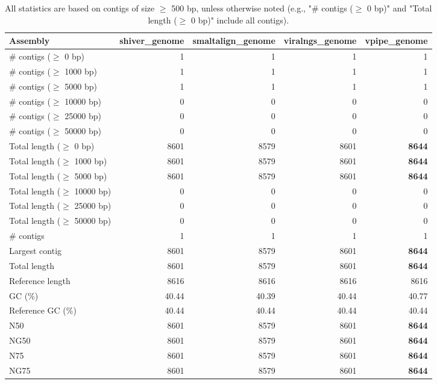 \documentclass[12pt,a4paper]{article}
\begin{document}
\begin{table}[ht]
\begin{center}
\caption{All statistics are based on contigs of size $\geq$ 500 bp, unless otherwise noted (e.g., "\# contigs ($\geq$ 0 bp)" and "Total length ($\geq$ 0 bp)" include all contigs).}
\begin{tabular}{|l*{4}{|r}|}
\hline
Assembly & shiver\_genome & smaltalign\_genome & viralngs\_genome & vpipe\_genome \\ \hline
\# contigs ($\geq$ 0 bp) & 1 & 1 & 1 & 1 \\ \hline
\# contigs ($\geq$ 1000 bp) & 1 & 1 & 1 & 1 \\ \hline
\# contigs ($\geq$ 5000 bp) & 1 & 1 & 1 & 1 \\ \hline
\# contigs ($\geq$ 10000 bp) & 0 & 0 & 0 & 0 \\ \hline
\# contigs ($\geq$ 25000 bp) & 0 & 0 & 0 & 0 \\ \hline
\# contigs ($\geq$ 50000 bp) & 0 & 0 & 0 & 0 \\ \hline
Total length ($\geq$ 0 bp) & 8601 & 8579 & 8601 & {\bf 8644} \\ \hline
Total length ($\geq$ 1000 bp) & 8601 & 8579 & 8601 & {\bf 8644} \\ \hline
Total length ($\geq$ 5000 bp) & 8601 & 8579 & 8601 & {\bf 8644} \\ \hline
Total length ($\geq$ 10000 bp) & 0 & 0 & 0 & 0 \\ \hline
Total length ($\geq$ 25000 bp) & 0 & 0 & 0 & 0 \\ \hline
Total length ($\geq$ 50000 bp) & 0 & 0 & 0 & 0 \\ \hline
\# contigs & 1 & 1 & 1 & 1 \\ \hline
Largest contig & 8601 & 8579 & 8601 & {\bf 8644} \\ \hline
Total length & 8601 & 8579 & 8601 & {\bf 8644} \\ \hline
Reference length & 8616 & 8616 & 8616 & 8616 \\ \hline
GC (\%) & 40.44 & 40.39 & 40.44 & 40.77 \\ \hline
Reference GC (\%) & 40.44 & 40.44 & 40.44 & 40.44 \\ \hline
N50 & 8601 & 8579 & 8601 & {\bf 8644} \\ \hline
NG50 & 8601 & 8579 & 8601 & {\bf 8644} \\ \hline
N75 & 8601 & 8579 & 8601 & {\bf 8644} \\ \hline
NG75 & 8601 & 8579 & 8601 & {\bf 8644} \\ \hline

\end{tabular}
\end{center}
\end{table}
\end{document}
